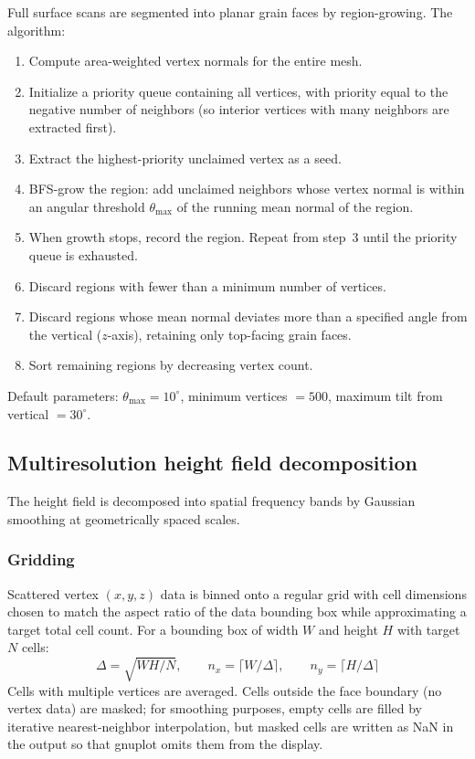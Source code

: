 \documentclass[11pt]{article}
\begin{document}
Full surface scans are segmented into planar grain faces by
region-growing.  The algorithm:

\begin{enumerate}
\item Compute area-weighted vertex normals for the entire mesh.
\item Initialize a priority queue containing all vertices, with
  priority equal to the negative number of neighbors (so interior
  vertices with many neighbors are extracted first).
\item Extract the highest-priority unclaimed vertex as a seed.
\item BFS-grow the region: add unclaimed neighbors whose vertex
  normal is within an angular threshold $\theta_{\max}$ of the
  running mean normal of the region.
\item When growth stops, record the region.  Repeat from step~3
  until the priority queue is exhausted.
\item Discard regions with fewer than a minimum number of vertices.
\item Discard regions whose mean normal deviates more than a
  specified angle from the vertical ($z$-axis), retaining only
  top-facing grain faces.
\item Sort remaining regions by decreasing vertex count.
\end{enumerate}

Default parameters: $\theta_{\max} = 10^{\circ}$,
minimum vertices $= 500$, maximum tilt from vertical $= 30^{\circ}$.

\subsection{Multiresolution height field decomposition}

The height field is decomposed into spatial frequency bands by
Gaussian smoothing at geometrically spaced scales.

\subsubsection{Gridding}

Scattered vertex $(x,y,z)$ data is binned onto a regular grid
with cell dimensions chosen to match the aspect ratio of the data
bounding box while approximating a target total cell count.  For a
bounding box of width $W$ and height $H$ with target $N$ cells:
\[
  \Delta = \sqrt{WH / N}, \qquad
  n_x = \lceil W/\Delta \rceil, \qquad
  n_y = \lceil H/\Delta \rceil
\]
Cells with multiple vertices are averaged.  Cells outside the face
boundary (no vertex data) are masked; for smoothing purposes, empty
cells are filled by iterative nearest-neighbor interpolation, but
masked cells are written as NaN in the output so that gnuplot omits
them from the display.
\end{document}
